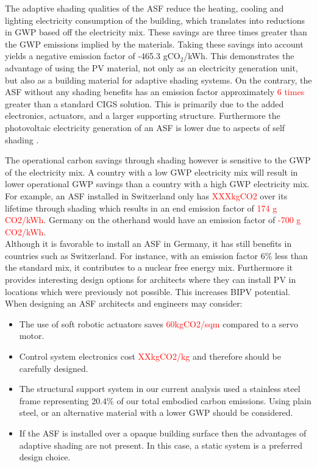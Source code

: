 
The adaptive shading qualities of the ASF reduce the heating, cooling and lighting electricity consumption of the building, which translates into reductions in GWP based off the electricity mix. These savings are three times greater than the GWP emissions implied by the materials. Taking these savings into account yields a negative emission factor of -465.3 gCO${_2}$/kWh. This demonstrates the advantage of using the PV material, not only as an electricity generation unit, but also as a building material for adaptive shading systems. On the contrary, the ASF without any shading benefits has an emission factor approximately \textcolor{red}{6 times} greater than a standard CIGS solution. This is primarily due to the added electronics, actuators, and a larger supporting structure. Furthermore the photovoltaic electricity generation of an ASF is lower due to aspects of self shading \cite{hofer2015photovoltaics}. 

The operational carbon savings through shading however is sensitive to the GWP of the electricity mix. A country with a low GWP electricity mix will result in lower operational GWP savings than a country with a high GWP electricity mix. For example, an ASF installed in Switzerland only has \textcolor{red}{XXXkgCO2} over its lifetime through shading which results in an end emission factor of \textcolor{red}{174 g CO2/kWh}. Germany on the otherhand would have an emission factor of \textcolor{red}{-700 g CO2/kWh}.\\

Although it is favorable to install an ASF in Germany, it has still benefits in countries such as Switzerland. For instance, with an emission factor 6\% less than the standard mix, it contributes to a nuclear free energy mix. Furthermore it provides interesting design options for architects where they can install PV in locations which were previously not possible. This increases BIPV potential.  \\

When designing an ASF architects and engineers may consider: 
\begin{itemize}
\item The use of soft robotic actuators saves \textcolor{red}{60kgCO2/sqm} compared to a servo motor. 
\item Control system electronics cost \textcolor{red}{XXkgCO2/kg} and therefore should be carefully designed.
\item The structural support system in our current analysis used a stainless steel frame representing 20.4\% of our total embodied carbon emissions. Using plain steel, or an alternative material with a lower GWP should be considered.
\item If the ASF is installed over a opaque building surface then the advantages of adaptive shading are not present. In this case, a static system is a preferred design choice. 
\end{itemize}


